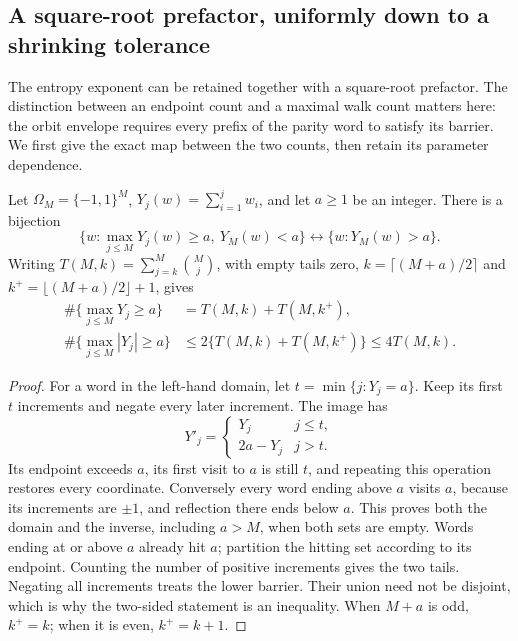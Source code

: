 \subsection{A square-root prefactor, uniformly down to a shrinking tolerance}
The entropy exponent can be retained together with a square-root
prefactor. The distinction between an endpoint count and a maximal
walk count matters here: the orbit envelope requires every prefix of
the parity word to satisfy its barrier. We first give the exact map
between the two counts, then retain its parameter dependence.

\begin{lemma}
\label{lem:Shaik-exact-reflection}
Let \(\Omega_M=\{-1,1\}^M\), \(Y_j(w)=\sum_{i=1}^j w_i\),
and let \(a\ge1\) be an integer. There is a bijection
\[
 \{w:\max_{j\le M}Y_j(w)\ge a,\ Y_M(w)<a\}
 \longleftrightarrow \{w:Y_M(w)>a\}.
\]
Writing \(T(M,k)=\sum_{j=k}^M\binom Mj\), with empty tails zero,
\(k=\lceil(M+a)/2\rceil\) and \(k^+=\lfloor(M+a)/2\rfloor+1\), gives
\begin{align}
 \#\{\max_{j\le M}Y_j\ge a\}&=T(M,k)+T(M,k^+),\nonumber\\
 \#\{\max_{j\le M}|Y_j|\ge a\}
 &\le2\{T(M,k)+T(M,k^+)\}\le4T(M,k).
 \label{eq:Shaik-reflection-tail}
\end{align}
\end{lemma}
\begin{proof}
For a word in the left-hand domain, let
\(t=\min\{j:Y_j=a\}\). Keep its first \(t\) increments and negate
every later increment. The image has
\[
 Y'_j=\begin{cases}Y_j&j\le t,\\2a-Y_j&j>t.\end{cases}
\]
Its endpoint exceeds \(a\), its first visit to \(a\) is still \(t\),
and repeating this operation restores every coordinate. Conversely
every word ending above \(a\) visits \(a\), because its increments
are \(\pm1\), and reflection there ends below \(a\).
This proves both the domain and the inverse, including \(a>M\),
when both sets are empty. Words ending at or above \(a\) already
hit \(a\); partition the hitting set according to its endpoint.
Counting the number of positive increments gives the two tails.
Negating all increments treats the lower barrier. Their union need
not be disjoint, which is why the two-sided statement is an inequality.
When \(M+a\) is odd, \(k^+=k\); when it is even, \(k^+=k+1\).
\end{proof}

